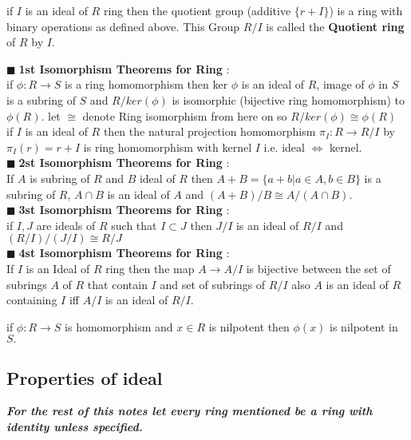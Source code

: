 \documentclass[11pt]{extarticle}
\newcommand{\ra}{\rightarrow}
\newcommand{\tbx}[2][]{
	\begin{tcolorbox}[enhanced,breakable,size=small,colback=black!2!white,title={#1},arc is angular, arc=1.5mm,drop fuzzy shadow]
		#2
	\end{tcolorbox}
}
\newcommand{\y}{$\blacksquare\;$}
\begin{document}
\begin{multicols}{2}
{			} 
\tbx{ if $ I $ is an ideal of $ R $ ring then the quotient group (additive $ \{r+I\} $) is a ring with binary operations as defined above. This Group $ R/I $ is called the \textbf{Quotient ring} of $ R $ by $ I. $
			} 
\tbx[\textbf{Isomorphism Theorems for Ring}]{
			\y \textbf{1st Isomorphism Theorems for Ring} : \\ 
			if $ \phi : R\ra S $ is a ring homomorphism then ker $ \phi $ is an ideal of $ R $, image of $ \phi $ in $ S $ is a subring of $ S $ and $ R/ker(\phi) $ is isomorphic (bijective ring homomorphism) to $ \phi(R) .$ let $ \cong $ denote Ring isomorphism from here on so $ R/ker(\phi)\cong \phi(R) $\\
			if $ I $ is an ideal of $ R $ then the natural projection homomorphism $ \pi_I:R \ra R/I $ by $ \pi_I(r)=r+I $ is ring homomorphism   with kernel $ I $ i.e. ideal $ \iff $ kernel.\\
			\y  \textbf{2st Isomorphism Theorems for Ring} : \\ 
			If $ A $ is subring of $ R $ and $ B $ ideal of  $ R $ then $ A+B=\{a+b|a\in A,b\in B\} $ is a subring of $ R $, $ A\cap B $ is an ideal of $ A $ and $ (A+B)/B\cong A/(A\cap B) .$\\
			\y  \textbf{3st Isomorphism Theorems for Ring} : \\ 
			if $ I,J $ are ideals of $ R $ such that $ I	\subset J $ then $ J/I $ is an ideal of $ R/I $ and $ (R/I)/(J/I)\cong R/J $\\
			\y \textbf{4st Isomorphism Theorems for Ring} :  \\
			If $ I $ is an Ideal of $ R $ ring then the map $ A\ra A/I $ is bijective between the set of subrings $ A $ of $ R $ that contain $ I $ and set of subrings of $ R/I $ also $ A $ is an ideal of $ R $ containing $ I $ iff $ A/I $ is an ideal of $ R/I .$
			} 
\tbx{if $ \phi : R \ra S $ is homomorphism and $ x	\in  R$ is nilpotent then $ \phi(x) $ is nilpotent in $ S. $}
			\subsection{Properties of ideal}
			\begin{tcolorbox}[enhanced,size=title,colback=black!5!white,arc is angular, arc=1.5mm,drop fuzzy shadow]
				\textbf{\emph{For the rest of this notes let every ring mentioned be a ring with identity unless specified.}}
			\end{tcolorbox}
			

\end{multicols}
\end{document}
